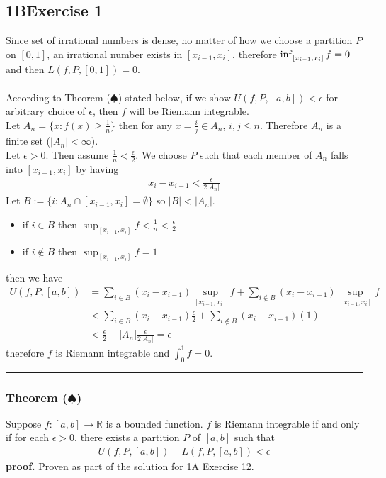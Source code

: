 \documentclass[12pt, letterpaper]{article}
\newcommand{\R}{\mathbb{R}}
\renewcommand{\L}{L}
\newcommand{\U}{U}
\renewcommand{\inf}{\mathop{\mathrm{inf}\vphantom{\mathrm{sup}}}}
\begin{document}
{\subsection*{1\hspace{1pt}B\hspace{20pt}Exercise 1}
Since set of irrational numbers is dense, no matter of how we choose a partition $P$ on $[0,1]$, an irrational number exists in $[x_{i-1},x_i]$, therefore $\inf_{[x_{i-1}, x_i]}f=0$ and then $L(f,P,[0,1])=0$.
\\\\
According to Theorem ($\spadesuit$) stated below, if we show $U(f,P,[a,b])<\epsilon$ for arbitrary choice of $\epsilon$, then $f$ will be Riemann integrable.
\\
Let $A_n=\{x: f(x)\geq \frac{1}{n}\}$ then for any $x=\frac{i}{j}\in A_n$, $i,j\leq n$. Therefore $A_n$ is a finite set ($|A_n|<\infty$).
\\
Let $\epsilon>0$. Then assume $\frac{1}{n}<\frac{\epsilon}{2}$. We choose $P$ such that each member of $A_n$ falls into $[x_{i-1}, x_i]$ by having
\begin{align*}
    x_i-x_{i-1}<\frac{\epsilon}{2|A_n|}
\end{align*}
Let $B:=\{i: A_n\cap[x_{i-1}, x_i]=\emptyset\}$ so $|B|<|A_n|$.
\begin{itemize}
    \item if $i\in B$ then $\sup_{[x_{i-1}, x_i]}f<\frac{1}{n}<\frac{\epsilon}{2}$
    \item if $i\notin B$ then $\sup_{[x_{i-1}, x_i]}f=1$
\end{itemize}
then we have
\begin{align*}
    U(f,P,[a,b])
    &=
    \sum_{i\in B}(x_i-x_{i-1})\sup_{[x_{i-1}, x_i]}f+\sum_{i\notin B}(x_i-x_{i-1})\sup_{[x_{i-1}, x_i]}f\\
    &<
    \sum_{i\in B}(x_i-x_{i-1})\frac{\epsilon}{2}+\sum_{i\notin B}(x_i-x_{i-1})(1)\\
    &<
    \frac{\epsilon}{2}+|A_n|\frac{\epsilon}{2|A_n|}=\epsilon
\end{align*}
therefore $f$ is Riemann integrable and $\int_0^1f=0$.\\
\hrule

\subsubsection*{Theorem ($\spadesuit$)}
{\color{violet}Suppose $f: [a,b]\rightarrow \R$ is a bounded function. $f$ is Riemann integrable if and only if for each $\epsilon>0$, there exists a partition $P$ of $[a,b]$ such that 
\begin{align*}
    \U(f, P, [a,b])-\L(f, P, [a,b])<\epsilon
\end{align*}
}\textbf{proof.} Proven as part of the solution for {\color{blue}1A Exercise 12}.
\clearpage

}
\end{document}
